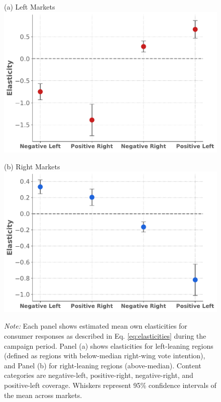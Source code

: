 \documentclass[12pt]{article}
\begin{document}
\begin{figure}[!htbp]
	 	\begin{minipage}{0.45\textwidth}
	 		\centering
	 		(a) Left Markets\\
	 		\includegraphics[width=\linewidth]{figures/elasticities_left_campaign}
	 	\end{minipage}
	 	\hfill
	 	\begin{minipage}{0.45\textwidth}
	 		\centering
	 		\vspace{1.5em}
	 		(b) Right Markets \\
	 		\includegraphics[width=\linewidth]{figures/elasticities_right_campaign}
	 		\label{fig:2figsA}
	 	\end{minipage}
	 	
	 	\vspace{0.5em} %
	 	
	 	\captionsetup{justification=justified}
	 	\caption*{\small  \textit{Note:}  Each panel shows estimated mean own elasticities for consumer responses  as described in Eq. \ref{eq:elasticities} during the campaign period. Panel (a) shows elasticities for left-leaning regions (defined as regions with below-median right-wing vote intention), and Panel (b) for right-leaning regions (above-median). Content categories are negative-left, positive-right, negative-right, and positive-left coverage. Whiskers represent 95\% confidence intervals of the mean across markets.}
	 	
	 \end{figure}
	 
\end{document}
